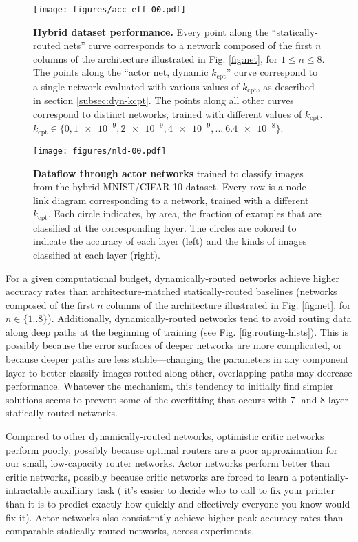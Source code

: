 \documentclass{article}
\begin{document}
  \begin{figure*}[p]
    \centering
    \texttt{[image: figures/acc-eff-00.pdf]}
    \caption{\textbf{Hybrid dataset performance.} Every point along the ``statically-routed nets'' curve corresponds to a network composed of the first $n$ columns of the architecture illustrated in Fig. \ref*{fig:net}, for $1 \leq n \leq 8$. The points along the ``actor net, dynamic $k_\text{cpt}$'' curve correspond to a single network evaluated with various values of $k_\text{cpt}$, as described in section \ref*{subsec:dyn-kcpt}. The points along all other curves correspond to distinct networks, trained with different values of $k_\text{cpt}$. $k_\text{cpt} \in \{0, \num{1e-9}, \num{2e-9}, \num{4e-9}, ...~ \num{6.4e-8}\}$.}
    \label{fig:acc-eff-00}
  \end{figure*}
  
  \begin{figure*}[p]
    \centering
    \texttt{[image: figures/nld-00.pdf]}
    \caption{\textbf{Dataflow  through  actor networks} trained to classify images from the hybrid MNIST/CIFAR-10 dataset. Every row is a node-link diagram corresponding to a network, trained with a different $k_\text{cpt}$. Each circle indicates,  by area,  the fraction of examples that are classified at the corresponding layer. The circles are colored to indicate the accuracy of each layer (left) and the kinds of images classified at each layer (right).}
    \label{fig:nld-00}
  \end{figure*}

  For a given computational budget, dynamically-routed networks achieve higher accuracy rates than architecture-matched statically-routed baselines (networks composed of the first $n$ columns of the architecture illustrated in Fig. \ref*{fig:net}, for $n \in \{1..8\}$). Additionally, dynamically-routed networks tend to avoid routing data along deep paths at the beginning of training (see Fig. \ref*{fig:routing-hists}). This is possibly because the error surfaces of deeper networks are more complicated, or because deeper paths are less stable---changing the parameters in any component layer to better classify images routed along other, overlapping paths may decrease performance. Whatever the mechanism, this tendency to initially find simpler solutions seems to prevent some of the overfitting that occurs with 7- and 8-layer statically-routed networks.
  
  Compared to other dynamically-routed networks, optimistic critic networks perform poorly, possibly because optimal routers are a poor approximation for our small, low-capacity router networks. Actor networks perform better than critic networks, possibly because critic networks are forced to learn a potentially-intractable auxilliary task ( it's easier to decide who to call to fix your printer than it is to predict exactly how quickly and effectively everyone you know would fix it). Actor networks also consistently achieve higher peak accuracy rates than comparable statically-routed networks, across experiments.
  
\end{document}
